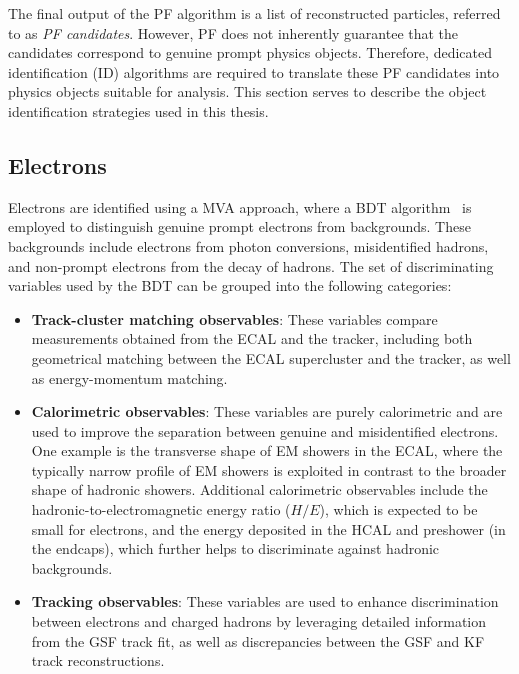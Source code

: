The final output of the PF algorithm is a list of reconstructed particles, referred to as \textit{PF candidates}. However, PF does not inherently guarantee that the candidates correspond to genuine prompt physics objects. Therefore, dedicated identification (ID) algorithms are required to translate these PF candidates into physics objects suitable for analysis. This section serves to describe the object identification strategies used in this thesis.

\subsection{Electrons}
\label{Section:Electron_Identification}

Electrons are identified using a \ac{MVA} approach, where a \ac{BDT} algorithm~\cite{Electron_ID} is employed to distinguish genuine prompt electrons from backgrounds. These backgrounds include electrons from photon conversions, misidentified hadrons, and non-prompt electrons from the decay of hadrons. The set of discriminating variables used by the BDT can be grouped into the following categories:

\begin{itemize}
    \item \textbf{Track-cluster matching observables}: These variables compare measurements obtained from the ECAL and the tracker, including both geometrical matching between the ECAL supercluster and the tracker, as well as energy-momentum matching.
    \item \textbf{Calorimetric observables}: These variables are purely calorimetric and are used to improve the separation between genuine and misidentified electrons. One example is the transverse shape of EM showers in the ECAL, where the typically narrow profile of EM showers is exploited in contrast to the broader shape of hadronic showers. Additional calorimetric observables include the hadronic-to-electromagnetic energy ratio ($H/E$), which is expected to be small for electrons, and the energy deposited in the HCAL and preshower (in the endcaps), which further helps to discriminate against hadronic backgrounds.
    \item \textbf{Tracking observables}: These variables are used to enhance discrimination between electrons and charged hadrons by leveraging detailed information from the GSF track fit, as well as discrepancies between the GSF and KF track reconstructions.
\end{itemize}

